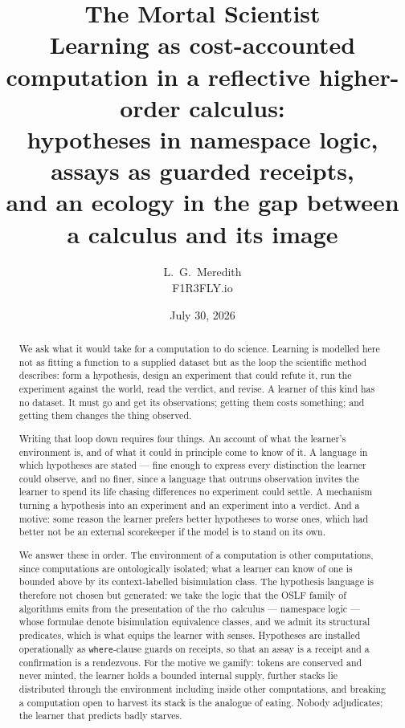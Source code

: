 \documentclass[11pt]{article}
\title{\bfseries The Mortal Scientist\\[.35em]
\large Learning as cost-accounted computation in a reflective higher-order calculus:\\
hypotheses in namespace logic, assays as guarded receipts,\\
and an ecology in the gap between a calculus and its image}
\author{L.\ G.\ Meredith\\ \small F1R3FLY.io}
\date{July 30, 2026}
\theoremstyle{plain}
\theoremstyle{definition}
\newcommand{\rhoc}{\textsf{rho}}
\begin{document}
\maketitle

\begin{abstract}
We ask what it would take for a computation to do science. Learning is modelled here not as fitting a
function to a supplied dataset but as the loop the scientific method describes: form a hypothesis,
design an experiment that could refute it, run the experiment against the world, read the verdict, and
revise. A learner of this kind has no dataset. It must go and get its observations; getting them costs
something; and getting them changes the thing observed.

Writing that loop down requires four things. An account of what the learner's environment is, and of
what it could in principle come to know of it. A language in which hypotheses are stated --- fine
enough to express every distinction the learner could observe, and no finer, since a language that
outruns observation invites the learner to spend its life chasing differences no experiment could
settle. A mechanism turning a hypothesis into an experiment and an experiment into a verdict. And a
motive: some reason the learner prefers better hypotheses to worse ones, which had better not be an
external scorekeeper if the model is to stand on its own.

We answer these in order. The environment of a computation is other computations, since computations
are ontologically isolated; what a learner can know of one is bounded above by its context-labelled
bisimulation class. The hypothesis language is therefore not chosen but generated: we take the logic
that the OSLF family of algorithms emits from the presentation of the \rhoc\ calculus --- namespace
logic --- whose formulae denote bisimulation equivalence classes, and we admit its structural
predicates, which is what equips the learner with senses. Hypotheses are installed operationally as
\texttt{where}-clause guards on receipts, so that an assay is a receipt and a confirmation is a
rendezvous. For the motive we gamify: tokens are conserved and never minted, the learner holds a
bounded internal supply, further stacks lie distributed through the environment including inside other
computations, and breaking a computation open to harvest its stack is the analogue of eating. Nobody
adjudicates; the learner that predicts badly starves.


\end{abstract}
\end{document}
